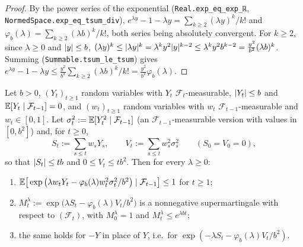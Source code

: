 \begin{proof}
\leanok
By the power series of the exponential (\texttt{Real.exp\_eq\_exp\_ℝ},
\texttt{NormedSpace.exp\_eq\_tsum\_div}), $e^{\lambda y} - 1 - \lambda y = \sum_{k \ge 2} (\lambda y)^k/k!$
and $\varphi_b(\lambda) = \sum_{k \ge 2} (\lambda b)^k/k!$, both series being absolutely convergent.
For $k \ge 2$, since $\lambda \ge 0$ and $\lvert y \rvert \le b$,
$(\lambda y)^k \le \lvert \lambda y \rvert^k = \lambda^k y^2 \lvert y \rvert^{k - 2} \le \lambda^k y^2 b^{k - 2} = \frac{y^2}{b^2}(\lambda b)^k$.
Summing (\texttt{Summable.tsum\_le\_tsum}) gives
$e^{\lambda y} - 1 - \lambda y \le \frac{y^2}{b^2} \sum_{k \ge 2} (\lambda b)^k/k! = \frac{y^2}{b^2}\varphi_b(\lambda)$.
\end{proof}

\begin{lemma}\label{lem:bernstein_exp_supermartingale}
\leanok
Let $b > 0$, $(Y_t)_{t \ge 1}$ random variables with $Y_t$ $\mathcal F_t$-measurable,
$\lvert Y_t \rvert \le b$ and $\mathbb{E}[Y_t \mid \mathcal F_{t-1}] = 0$, and $(w_t)_{t \ge 1}$ random variables
with $w_t$ $\mathcal F_{t-1}$-measurable and $w_t \in [0, 1]$. Let $\sigma_t^2 := \mathbb{E}[Y_t^2 \mid \mathcal F_{t-1}]$
(an $\mathcal F_{t-1}$-measurable version with values in $[0, b^2]$) and, for $t \ge 0$,
\[
  S_t := \sum_{s \le t} w_s Y_s, \qquad V_t := \sum_{s \le t} w_s^2 \sigma_s^2 \qquad (S_0 = V_0 = 0),
\]
so that $\lvert S_t \rvert \le tb$ and $0 \le V_t \le tb^2$. Then for every $\lambda \ge 0$:
\begin{enumerate}
\item[(i)] $\mathbb{E}\big[\exp\big(\lambda w_t Y_t - \varphi_b(\lambda) w_t^2 \sigma_t^2/b^2\big) \mid \mathcal F_{t-1}\big] \le 1$ for $t \ge 1$;
\item[(ii)] $M^\lambda_t := \exp\big(\lambda S_t - \varphi_b(\lambda) V_t/b^2\big)$ is a nonnegative
  supermartingale with respect to $(\mathcal F_t)$, with $M^\lambda_0 = 1$ and $M^\lambda_t \le e^{\lambda b t}$;
\item[(iii)] the same holds for $-Y$ in place of $Y$, i.e.\ for $\exp(-\lambda S_t - \varphi_b(\lambda) V_t/b^2)$.
\end{enumerate}
\end{lemma}


